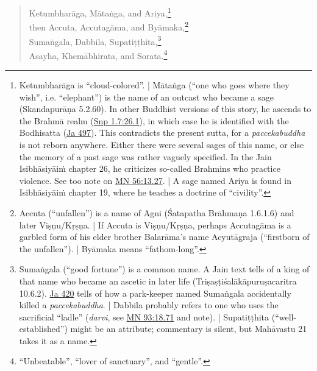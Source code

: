 \documentclass[12pt,openany]{book}%
\begin{document}
\begin{verse}
\textsanskrit{Ketumbharāga}, \textsanskrit{Mātaṅga}, and Ariya,\footnote{\textsanskrit{Ketumbharāga} is “cloud-colored”. | \textsanskrit{Mātaṅga} (“one who goes where they wish”, i.e. “elephant”) is the name of an outcast who became a sage (\textsanskrit{Skandapurāṇa} 5.2.60). In other Buddhist versions of this story, he ascends to the \textsanskrit{Brahmā} realm (\href{https://suttacentral.net/snp1.7/en/sujato\#26.1}{Snp 1.7:26.1}), in which case he is identified with the Bodhisatta (\href{https://suttacentral.net/ja497/en/sujato}{Ja 497}). This contradicts the present sutta, for a \textit{paccekabuddha} is not reborn anywhere. Either there were several sages of this name, or else the memory of a past sage was rather vaguely specified. In the Jain \textsanskrit{Isibhāsiyāiṁ} chapter 26, he criticizes so-called Brahmins who practice violence. See too note on \href{https://suttacentral.net/mn56/en/sujato\#13.27}{MN 56:13.27}. | A sage named Ariya is found in \textsanskrit{Isibhāsiyāiṁ} chapter 19, where he teaches a doctrine of “civility”. } \\
then Accuta, \textsanskrit{Accutagāma}, and \textsanskrit{Byāmaka},\footnote{Accuta (“unfallen”) is a name of Agni (Śatapatha \textsanskrit{Brāhmaṇa} 1.6.1.6) and later \textsanskrit{Viṣṇu}/\textsanskrit{Kṛṣṇa}. | If Accuta is \textsanskrit{Viṣṇu}/\textsanskrit{Kṛṣṇa}, perhaps \textsanskrit{Accutagāma} is a garbled form of his elder brother \textsanskrit{Balarāma}’s name \textsanskrit{Acyutāgraja} (“firstborn of the unfallen”). | \textsanskrit{Byāmaka} means “fathom-long”. } \\
\textsanskrit{Sumaṅgala}, Dabbila, \textsanskrit{Supatiṭṭhita},\footnote{\textsanskrit{Sumaṅgala} (“good fortune”) is a common name. A Jain text tells of a king of that name who became an ascetic in later life (\textsanskrit{Triṣaṣṭiśalākāpuruṣacaritra} 10.6.2). \href{https://suttacentral.net/ja420/en/sujato}{Ja 420} tells of how a park-keeper named \textsanskrit{Sumaṅgala} accidentally killed a \textit{paccekabuddha}. | Dabbila probably refers to one who uses the sacrificial “ladle” (\textit{darvi}, see \href{https://suttacentral.net/mn93/en/sujato\#18.71}{MN 93:18.71} and note). | \textsanskrit{Supatiṭṭhita} (“well-established”) might be an attribute; commentary is silent, but \textsanskrit{Mahāvastu} 21 takes it as a name. } \\
Asayha, \textsanskrit{Khemābhirata}, and Sorata.\footnote{“Unbeatable”, “lover of sanctuary”, and “gentle”. } 


\end{verse}
\end{document}
